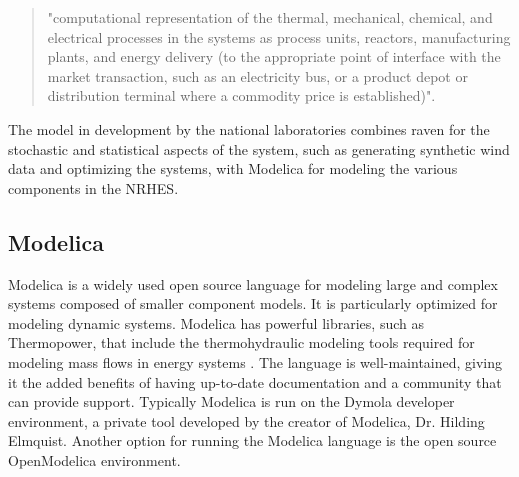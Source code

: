 \begin{quotation}

"computational representation of the thermal, mechanical, chemical, and electrical processes in the systems as process units, reactors, manufacturing plants, and energy delivery (to the appropriate point of interface with the market transaction, such as an electricity bus, or a product depot or distribution terminal where a commodity price is established)"\cite{Rabiti2015}.
\end{quotation}

The model in development by the national laboratories combines \ac{raven} for the stochastic and statistical aspects of the system, such as generating synthetic wind data and optimizing the systems, with Modelica for modeling the various components in the NRHES.

\subsection{Modelica}
Modelica is a widely used open source language for modeling large and complex systems composed of smaller component models. It is particularly optimized for modeling dynamic systems. Modelica has powerful libraries, such as Thermopower, that include the thermohydraulic modeling tools required for modeling mass flows in energy systems \cite{Binder2014}. The language is well-maintained, giving it the added benefits of having up-to-date documentation and a community that can provide support. Typically Modelica is run on the Dymola developer environment, a private tool developed by the creator of Modelica, Dr. Hilding Elmquist. Another option for running the Modelica language is the open source OpenModelica environment.

